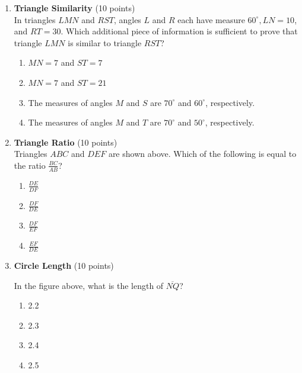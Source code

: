 \begin{enumerate}
  \newpage

  \item \textbf{Triangle Similarity} (10 points)\\
  In triangles $L M N$ and $R S T$, angles $L$ and $R$ each have measure $60^{\circ}, L N=10$, and $R T=30$. Which additional piece of information is sufficient to prove that triangle $L M N$ is similar to triangle $R S T$?\\
  \begin{enumerate}[label=(\Alph*)]
    \item $M N=7$ and $S T=7$
    \item $M N=7$ and $S T=21$
    \item The measures of angles $M$ and $S$ are $70^{\circ}$ and $60^{\circ}$, respectively.
    \item The measures of angles $M$ and $T$ are $70^{\circ}$ and $50^{\circ}$, respectively.
  \end{enumerate}
  \begin{subanswer}
  \end{subanswer}


  \item \textbf{Triangle Ratio} (10 points)\\
  Triangles $A B C$ and $D E F$ are shown above. Which of the following is equal to the ratio $\frac{B C}{A B}$?\\
  \begin{enumerate}[label=(\Alph*)]
    \item $\frac{D E}{D F}$
    \item $\frac{D F}{D E}$
    \item $\frac{D F}{E F}$
    \item $\frac{E F}{D E}$
  \end{enumerate}
  \begin{subanswer}
  \end{subanswer}

  \newpage

  \item \textbf{Circle Length} (10 points)\\

  In the figure above, what is the length of $\overline{N Q}$?\\
  \begin{enumerate}[label=(\Alph*)]
    \item 2.2
    \item 2.3
    \item 2.4
    \item 2.5
  \end{enumerate}
  \begin{subanswer}
  \end{subanswer}


\end{enumerate}

